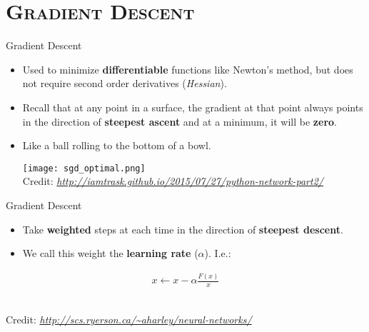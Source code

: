 \section{\scshape Gradient Descent}
\begin{frame}{Gradient Descent}
	\begin{itemize}
		\item Used to minimize \textbf{differentiable} functions like Newton's method, but does not require second order derivatives (\textit{Hessian}).
		\item Recall that at any point in a surface, the gradient at that point always points in the direction of \textbf{steepest ascent} and at a minimum, it will be \textbf{zero}.
		\item Like a ball rolling to the bottom of a bowl.
		\begin{center}
			\texttt{[image: sgd\_optimal.png]}\\[-1ex]
			{\tiny Credit: {\itshape \url{http://iamtrask.github.io/2015/07/27/python-network-part2/}}}
		\end{center}
	\end{itemize}
\end{frame}


\begin{frame}{Gradient Descent}
	\begin{itemize}
		\item Take \textbf{weighted} steps at each time in the direction of \textbf{steepest descent}.
		\item We call this weight the \textbf{learning rate} ($\alpha$). I.e.:
	\end{itemize}
	\begin{gather*}
		x \leftarrow x - \alpha \frac{F(x)}{x}
	\end{gather*}
	\begin{center}
		\\
		{\tiny Credit: {\itshape \url{http://scs.ryerson.ca/~aharley/neural-networks/}}}
	\end{center}
\end{frame}

